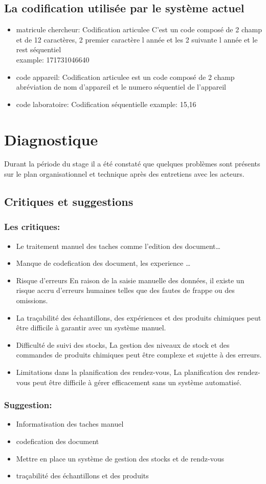 \subsection{La codification utilisée par le système actuel}
 \begin{itemize}
    \item matricule chercheur: Codification articulee 
    C’est un code composé de 2 champ et de 12 caractères, 2 premier caractère l année et les 2 suivante l année  et le rest séquentiel \\
    example: 171731046640
    \item code appareil: Codification articulee 
    est un code composé de 2 champ abréviation de nom  d'appareil et le numero séquentiel de l'appareil
    \item code laboratoire: Codification séquentielle 
    example: 15,16
 \end{itemize}
 \section{Diagnostique}
Durant la période du stage il a été constaté que quelques problèmes sont
présents sur le plan organisationnel et technique après des entretiens avec les
acteurs.
\subsection{Critiques et suggestions}
\subsubsection{Les critiques:}
\begin{itemize}
    \item Le traitement manuel des taches comme l'edition des document\dots
    \item Manque de codefication des document, les experience \dots
    \item Risque d'erreurs En raison de la saisie manuelle des données, il existe un risque accru d'erreurs humaines telles que des fautes de frappe ou des omissions.
    \item La traçabilité des échantillons, des expériences et des produits chimiques peut être difficile à garantir avec un système manuel.
    \item Difficulté de suivi des stocks, La gestion des niveaux de stock et des commandes de produits chimiques peut être complexe et sujette à des erreurs.
    \item Limitations dans la planification des rendez-vous, La planification des rendez-vous peut être difficile à gérer efficacement sans un système automatisé.
\end{itemize}
\subsubsection{Suggestion:}
\begin{itemize}
    \item Informatisation des taches manuel
    \item codefication des document 
    \item  Mettre en place un système de gestion des stocks et de rendz-vous
    \item traçabilité des échantillons et des produits
\end{itemize}